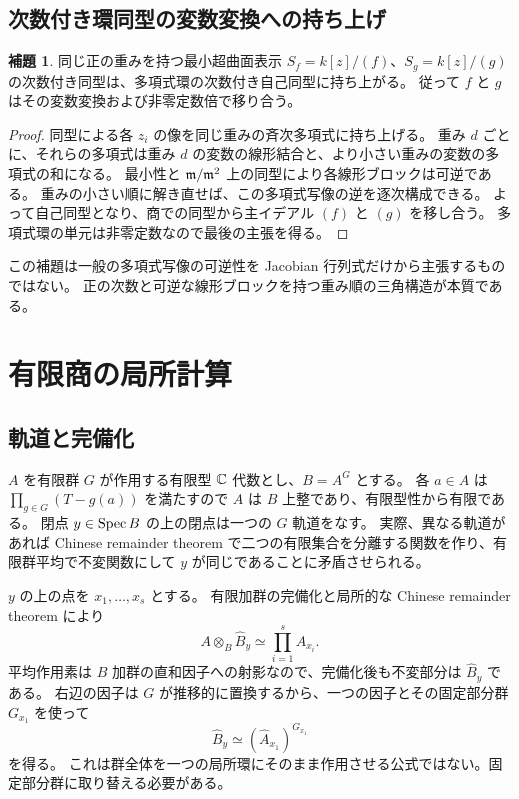 \documentclass[11pt,a4paper]{ltjsarticle}
\numberwithin{equation}{section}
\theoremstyle{definition}
\newtheorem{lemma}[theorem]{補題}
\begin{document}
\subsection{次数付き環同型の変数変換への持ち上げ}
\begin{lemma}\label{lem:gradedlift}
同じ正の重みを持つ最小超曲面表示 $S_f=k[z]/(f)$、$S_g=k[z]/(g)$ の次数付き同型は、多項式環の次数付き自己同型に持ち上がる。
従って $f$ と $g$ はその変数変換および非零定数倍で移り合う。
\end{lemma}
\begin{proof}
同型による各 $z_i$ の像を同じ重みの斉次多項式に持ち上げる。
重み $d$ ごとに、それらの多項式は重み $d$ の変数の線形結合と、より小さい重みの変数の多項式の和になる。
最小性と $\mathfrak m/\mathfrak m^2$ 上の同型により各線形ブロックは可逆である。
重みの小さい順に解き直せば、この多項式写像の逆を逐次構成できる。
よって自己同型となり、商での同型から主イデアル $(f)$ と $(g)$ を移し合う。
多項式環の単元は非零定数なので最後の主張を得る。
\end{proof}
この補題は一般の多項式写像の可逆性を Jacobian 行列式だけから主張するものではない。
正の次数と可逆な線形ブロックを持つ重み順の三角構造が本質である。

\section{有限商の局所計算}\label{app:local}
\subsection{軌道と完備化}
$A$ を有限群 $G$ が作用する有限型 $\mathbb C$ 代数とし、$B=A^G$ とする。
各 $a\in A$ は $\prod_{g\in G}(T-g(a))$ を満たすので $A$ は $B$ 上整であり、有限型性から有限である。
閉点 $y\in\operatorname{Spec} B$ の上の閉点は一つの $G$ 軌道をなす。
実際、異なる軌道があれば Chinese remainder theorem で二つの有限集合を分離する関数を作り、有限群平均で不変関数にして $y$ が同じであることに矛盾させられる。

$y$ の上の点を $x_1,\dots,x_s$ とする。
有限加群の完備化と局所的な Chinese remainder theorem により
\[
 A\otimes_B\widehat B_y\simeq\prod_{i=1}^s\widehat A_{x_i}.
\]
平均作用素は $B$ 加群の直和因子への射影なので、完備化後も不変部分は $\widehat B_y$ である。
右辺の因子は $G$ が推移的に置換するから、一つの因子とその固定部分群 $G_{x_1}$ を使って
\begin{equation}\label{eq:completioninvariants}
 \widehat B_y\simeq(\widehat A_{x_1})^{G_{x_1}}
\end{equation}
を得る。
これは群全体を一つの局所環にそのまま作用させる公式ではない。固定部分群に取り替える必要がある。
\end{document}

